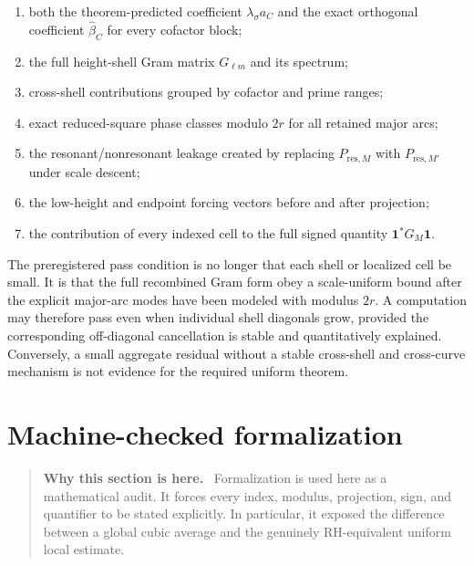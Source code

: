 \documentclass[11pt]{article}
\theoremstyle{definition}
\theoremstyle{remark}
\newcommand{\1}{\mathbf{1}}
\newenvironment{motivation}
  {\begin{quote}\small\color{ovvogray}\textbf{Why this section is here.}\ }
  {\end{quote}}
\begin{document}
\begin{enumerate}[leftmargin=1.7em,itemsep=0.3em]
\item both the theorem-predicted coefficient $\lambda_\sigma a_C$ and the exact
      orthogonal coefficient $\widehat\beta_C$ for every cofactor block;
\item the full height-shell Gram matrix $G_{\ell m}$ and its spectrum;
\item cross-shell contributions grouped by cofactor and prime ranges;
\item exact reduced-square phase classes modulo $2r$ for all retained major arcs;
\item the resonant/nonresonant leakage created by replacing
      $P_{\mathrm{res},M}$ with $P_{\mathrm{res},M'}$ under scale descent;
\item the low-height and endpoint forcing vectors before and after projection;
\item the contribution of every indexed cell to the full signed quantity
      $\mathbf1^*G_M\mathbf1$.
\end{enumerate}

The preregistered pass condition is no longer that each shell or localized cell be
small.  It is that the full recombined Gram form obey a scale-uniform bound after the
explicit major-arc modes have been modeled with modulus $2r$.  A computation may
therefore pass even when individual shell diagonals grow, provided the corresponding
off-diagonal cancellation is stable and quantitatively explained.  Conversely, a
small aggregate residual without a stable cross-shell and cross-curve mechanism is
not evidence for the required uniform theorem.


\section{Machine-checked formalization}
\label{sec:lean}

\begin{motivation}
Formalization is used here as a mathematical audit.  It forces every index, modulus, projection, sign, and quantifier to be stated explicitly.  In particular, it exposed the difference between a global cubic average and the genuinely RH-equivalent uniform local estimate.
\end{motivation}
\end{document}
